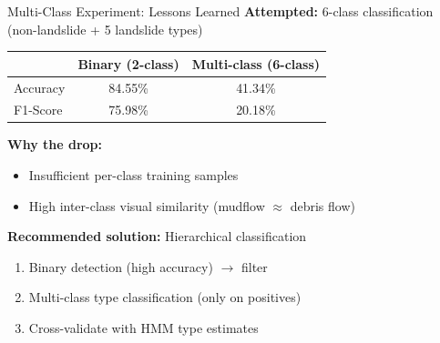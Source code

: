 \documentclass[aspectratio=169]{beamer}
\begin{document}
\begin{frame}{Multi-Class Experiment: Lessons Learned}
    \textbf{Attempted:} 6-class classification (non-landslide + 5 landslide types)

    \begin{table}
        \centering
        \begin{tabular}{lcc}
            \toprule
            & \textbf{Binary (2-class)} & \textbf{Multi-class (6-class)} \\
            \midrule
            Accuracy & 84.55\% & 41.34\% \\
            F1-Score & 75.98\% & 20.18\% \\
            \bottomrule
        \end{tabular}
    \end{table}

    \textbf{Why the drop:}
    \begin{itemize}
        \item Insufficient per-class training samples
        \item High inter-class visual similarity (mudflow $\approx$ debris flow)
    \end{itemize}

    \textbf{Recommended solution:} Hierarchical classification
    \begin{enumerate}
        \item Binary detection (high accuracy) $\to$ filter
        \item Multi-class type classification (only on positives)
        \item Cross-validate with HMM type estimates
    \end{enumerate}
\end{frame}
\end{document}
